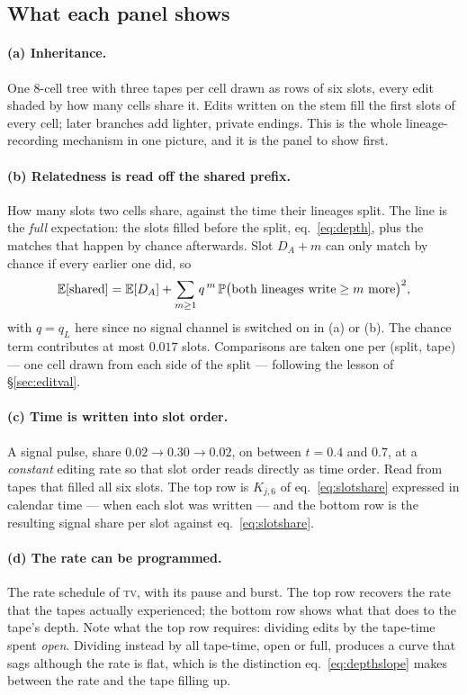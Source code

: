 \subsection{What each panel shows}

\paragraph{(a) Inheritance.} One 8-cell tree with three tapes per cell drawn as rows of six slots,
every edit shaded by how many cells share it. Edits written on the stem fill the first slots of every
cell; later branches add lighter, private endings. This is the whole lineage-recording mechanism in
one picture, and it is the panel to show first.

\paragraph{(b) Relatedness is read off the shared prefix.} How many slots two cells share, against the
time their lineages split. The line is the \emph{full} expectation: the slots filled before the split,
eq.~\eqref{eq:depth}, plus the matches that happen by chance afterwards. Slot $D_A+m$ can only match by
chance if every earlier one did, so
\begin{equation}
  \mathbb{E}[\text{shared}] = \mathbb{E}[D_A] + \sum_{m\ge1} q^{\,m}\,
     \mathbb{P}\big(\text{both lineages write}\ge m\text{ more}\big)^2 ,
  \label{eq:shared}
\end{equation}
with $q=q_L$ here since no signal channel is switched on in (a) or (b). The chance term contributes at
most $0.017$ slots. Comparisons are taken one per (split, tape) --- one cell drawn from each side of
the split --- following the lesson of \S\ref{sec:editval}.

\paragraph{(c) Time is written into slot order.} A signal pulse, share $0.02\to0.30\to0.02$, on between
$t=0.4$ and $0.7$, at a \emph{constant} editing rate so that slot order reads directly as time order.
Read from tapes that filled all six slots. The top row is $K_{j,6}$ of eq.~\eqref{eq:slotshare}
expressed in calendar time --- when each slot was written --- and the bottom row is the resulting
signal share per slot against eq.~\eqref{eq:slotshare}.

\paragraph{(d) The rate can be programmed.} The rate schedule of \textsc{tv}, with its pause and burst.
The top row recovers the rate that the tapes actually experienced; the bottom row shows what that does
to the tape's depth. Note what the top row requires: dividing edits by the tape-time spent
\emph{open}. Dividing instead by all tape-time, open or full, produces a curve that sags although the
rate is flat, which is the distinction eq.~\eqref{eq:depthslope} makes between the rate and the tape
filling up.

